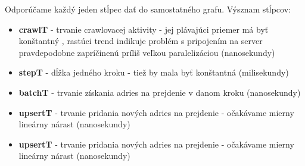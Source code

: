 Odporúčame každý jeden stĺpec dať do samostatného grafu. Výsznam stĺpcov: 
\begin{itemize}
    \item \textbf{crawlT} - trvanie crawlovacej aktivity - jej plávajúci priemer má byť konštantný , rastúci trend indikuje problém s pripojením na server pravdepodobne zapríčinenú príliš veľkou paralelizáciou (nanosekundy)
    \item \textbf{stepT} - dĺžka jedného kroku - tiež by mala byť konštantná (milisekundy)
    \item \textbf{batchT} - trvanie získania adries na prejdenie v danom kroku (nanosekundy)
    \item \textbf{upsertT} - trvanie pridania nových adries na prejdenie - očakávame mierny lineárny nárast (nanosekundy)
    \item \textbf{upsertT} - trvanie pridania nových adries na prejdenie - očakávame mierny lineárny nárast (nanosekundy)
\end{itemize}


